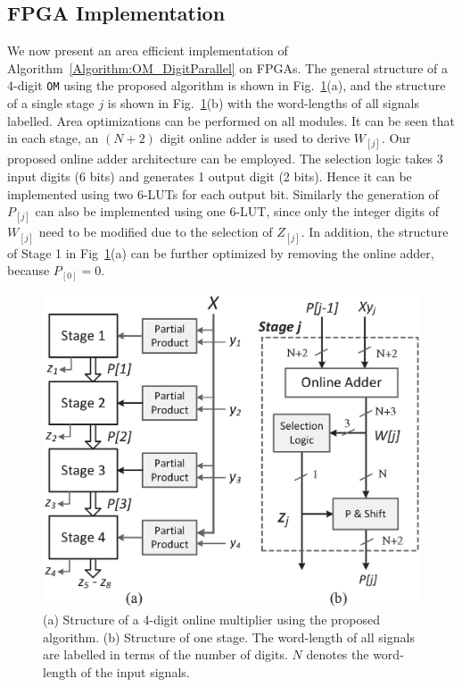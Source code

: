 \documentclass[conference]{IEEEtran}
\begin{document}
\subsection{FPGA Implementation}\vspace{-0.5ex}
We now present an area efficient implementation of Algorithm~\ref{Algorithm:OM_DigitParallel} on FPGAs. The general structure of a 4-digit \texttt{OM} using the proposed algorithm is shown in Fig.~\ref{Fig:PMStructure}(a), and the structure of a single stage $j$ is shown in Fig.~\ref{Fig:PMStructure}(b) with the word-lengths of all signals labelled. Area optimizations can be performed on all modules. It can be seen that in each stage, an $(N+2)$ digit online adder is used to derive $W_{[j]}$. Our proposed online adder architecture can be employed. The selection logic takes 3 input digits (6 bits) and generates 1 output digit (2 bits). Hence it can be implemented using two 6-LUTs for each output bit. Similarly the generation of $P_{[j]}$ can also be implemented using one 6-LUT, since only the integer digits of $W_{[j]}$ need to be modified due to the selection of $Z_{[j]}$. In addition, the structure of Stage 1 in Fig~\ref{Fig:PMStructure}(a) can be further optimized by removing the online adder, because $P_{[0]}=0$.\vspace{-0.5ex}
%
\begin{figure}[tbp]
	\centering
	\includegraphics[width=.45\textwidth]{./Figures/ParallelMult_Structure.eps}
	\vspace{-1ex}
	\caption{(a) Structure of a 4-digit online multiplier using the proposed algorithm. (b) Structure of one stage. The word-length of all signals are labelled in terms of the number of digits. $N$ denotes the word-length of the input signals.}
	\label{Fig:PMStructure}
	\vspace{-2ex}
\end{figure}
\end{document}
